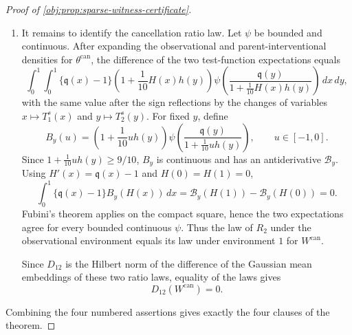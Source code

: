 \begin{proof}[Proof of \cref{obj:prop:sparse-witness-certificate}]
\begin{enumerate}
\item It remains to identify the cancellation ratio law.  Let \(\psi\) be bounded and continuous.  After expanding the observational and parent-interventional densities for \(\theta^{\mathrm{can}}\), the difference of the two test-function expectations equals
\[
\int_0^1\!\int_0^1
\{\mathfrak q(x)-1\}
\left(1+\frac1{10}H(x)h(y)\right)
\psi\!\left(
\frac{\mathfrak q(y)}
     {1+\frac1{10}H(x)h(y)}
\right)\,dx\,dy,
\]
with the same value after the sign reflections by the changes of variables \(x\mapsto T_1^s(x)\) and \(y\mapsto T_2^s(y)\).  For fixed \(y\), define
\[
B_y(u)=
\left(1+\frac1{10}u h(y)\right)
\psi\!\left(
\frac{\mathfrak q(y)}{1+\frac1{10}u h(y)}
\right),
\qquad u\in[-1,0].
\]
Since \(1+\frac1{10}u h(y)\ge9/10\), \(B_y\) is continuous and has an antiderivative \(\mathcal B_y\).  Using \(H'(x)=\mathfrak q(x)-1\) and \(H(0)=H(1)=0\),
\[
\int_0^1\{\mathfrak q(x)-1\}B_y(H(x))\,dx
=
\mathcal B_y(H(1))-\mathcal B_y(H(0))
=
0.
\]
Fubini's theorem applies on the compact square, hence the two expectations agree for every bounded continuous \(\psi\).  Thus the law of \(R_2\) under the observational environment equals its law under environment \(1\) for \(W^{\mathrm{can}}\). %

Since \(D_{12}\) is the Hilbert norm of the difference of the Gaussian mean embeddings of these two ratio laws, equality of the laws gives
\[
D_{12}(W^{\mathrm{can}})=0.
\]
\end{enumerate}

Combining the four numbered assertions gives exactly the four clauses of the theorem. %
\end{proof}

